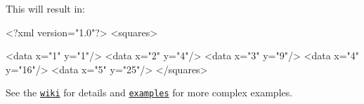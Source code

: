This will result in\+:


\begin{DoxyCode}
<?xml version="1.0"?>
<squares>
  
  <data x="1" y="1"/>
  <data x="2" y="4"/>
  <data x="3" y="9"/>
  <data x="4" y="16"/>
  <data x="5" y="25"/>
</squares>
\end{DoxyCode}


See the \href{https://github.com/oozcitak/xmlbuilder-js/wiki}{\tt wiki} for details and \href{https://github.com/oozcitak/xmlbuilder-js/wiki/Examples}{\tt examples} for more complex examples. 